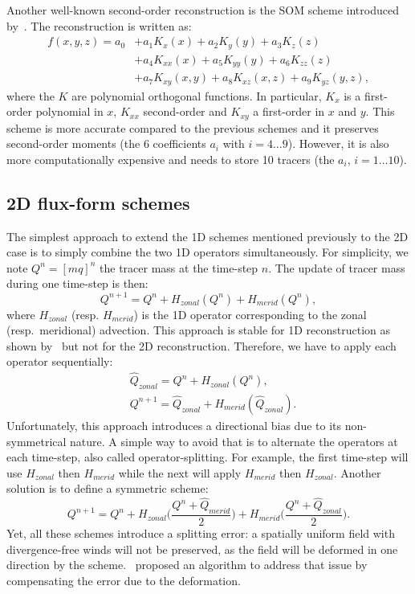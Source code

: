 Another well-known second-order reconstruction is the \gls{SOM} scheme
introduced by~\cite{Prather1986}. The reconstruction is written as:
\begin{align*}
  f(x,y,z) = a_0 &+ a_1 K_x(x) + a_2 K_y(y) + a_3 K_z(z)\\
  & + a_4 K_{xx}(x) + a_5 K_{yy}(y) + a_6 K_{zz}(z)\\
  & + a_7 K_{xy}(x,y) + a_8 K_{xz}(x,z) + a_9 K_{yz}(y,z),
\end{align*}
where the $K$ are polynomial orthogonal functions. In particular, $K_x$ is a
first-order polynomial in $x$, $K_{xx}$ second-order and $K_{xy}$ a first-order
in $x$ and $y$. This scheme is more accurate compared to the previous schemes
and it preserves second-order moments (the 6 coefficients $a_i$ with $i=4\dotsc 9$).
However, it is also more computationally expensive and needs to store 10 tracers
(the $a_i$, $i=1\dotsc 10$).

\subsection{2D flux-form schemes}
\label{subsec:2d_ff}
The simplest approach to extend the 1D schemes mentioned previously to the 2D
case is to simply combine the two 1D operators simultaneously. For simplicity,
we note $Q^n={[mq]}^n$ the tracer mass at the time-step $n$. The update of tracer
mass during one time-step is then:
\begin{equation}
  Q^{n+1} = Q^{n} + H_{zonal}(Q^n) + H_{merid}(Q^n),
\end{equation}
where $H_{zonal}$ (resp. $H_{merid}$) is the 1D operator corresponding to the
zonal (resp.\ meridional) advection.  This approach is stable for 1D
reconstruction as shown by~\cite{Leonard1996} but not for the 2D
reconstruction. Therefore, we have to apply each operator sequentially:
\begin{align}
\label{eqn:split1}
  &\widehat{Q}_{zonal} = Q^{n} + H_{zonal}(Q^n),\\
\label{eqn:split2}
  &Q^{n+1} = \widehat{Q}_{zonal} + H_{merid}(\widehat{Q}_{zonal}).
\end{align}
Unfortunately, this approach introduces a directional bias due to its
non-symmetrical nature. A simple way to avoid that is to alternate the operators
at each time-step, also called operator-splitting. For example, the first
time-step will use $H_{zonal}$ then $H_{merid}$ while the next will apply
$H_{merid}$ then $H_{zonal}$. Another solution is to define a symmetric scheme:
\begin{equation}
  Q^{n+1} = Q^n + H_{zonal}\Big(\frac{Q^n + \widehat{Q}_{merid}}{2}\Big) + 
  H_{merid}\Big(\frac{Q^n + \widehat{Q}_{zonal}}{2}\Big).
\end{equation}
Yet, all these schemes introduce a splitting error: a spatially uniform field with
divergence-free winds will not be preserved, as the field will be deformed in
one direction by the scheme.~\cite{Lin1996} proposed an algorithm to address
that issue by compensating the error due to the deformation.

